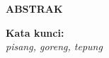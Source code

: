 \clearpage
{}
\begin{center}
  \textbf{\large \MakeUppercase{Abstrak}}\\[3em]
\end{center}

\blindtext{}


\noindent \textbf{Kata kunci:}\\
\emph{pisang, goreng, tepung}
